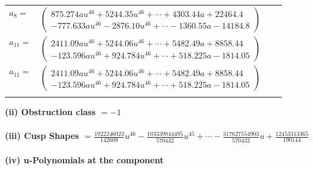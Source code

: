 \documentclass[1p]{elsarticle_modified}
\theoremstyle{definition}
\begin{document}
\begin{tabular}{m{7pt} m{180pt} m{7pt} m{180pt} }
\flushright $a_{8}=$&$\begin{pmatrix}875.274 a u^{46}+5244.35 u^{46}+\cdots+4303.44 a+22464.4\\-777.633 a u^{46}-2876.10 u^{46}+\cdots-1360.55 a-14184.8\end{pmatrix}$ \\
\flushright $a_{11}=$&$\begin{pmatrix}2411.09 a u^{46}+5244.06 u^{46}+\cdots+5482.49 a+8858.44\\-123.596 a u^{46}+924.784 u^{46}+\cdots+518.225 a-1814.05\end{pmatrix}$\\ \flushright $a_{11}=$&$\begin{pmatrix}2411.09 a u^{46}+5244.06 u^{46}+\cdots+5482.49 a+8858.44\\-123.596 a u^{46}+924.784 u^{46}+\cdots+518.225 a-1814.05\end{pmatrix}$\\&\end{tabular}
\flushleft \textbf{(ii) Obstruction class $= -1$}\\~\\
\flushleft \textbf{(iii) Cusp Shapes $= \frac{1922246023}{142608} u^{46}-\frac{103339844495}{570432} u^{45}+\cdots-\frac{317627554903}{570432} u+\frac{12453313365}{190144}$}\\~\\
\newpage\renewcommand{\arraystretch}{1}
\flushleft \textbf{(iv) u-Polynomials at the component}\newline \\
\end{document}
